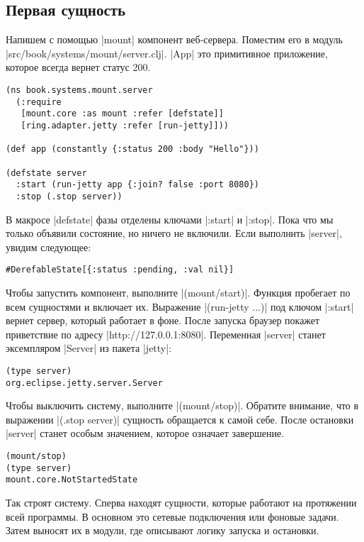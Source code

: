 \subsection{Первая сущность}

Напишем с помощью \spverb|mount| компонент веб-сервера. Поместим его в модуль
\spverb|src/book/systems/mount/server.clj|. \spverb|App| это примитивное
приложение, которое всегда вернет статус 200.

\begin{verbatim}
(ns book.systems.mount.server
  (:require
   [mount.core :as mount :refer [defstate]]
   [ring.adapter.jetty :refer [run-jetty]]))

(def app (constantly {:status 200 :body "Hello"}))

(defstate server
  :start (run-jetty app {:join? false :port 8080})
  :stop (.stop server))
\end{verbatim}

В макросе \spverb|defstate| фазы отделены ключами \spverb|:start| и
\spverb|:stop|. Пока что мы только объявили состояние, но ничего не
включили. Если выполнить \spverb|server|, увидим следующее:

\begin{verbatim}
#DerefableState[{:status :pending, :val nil}]
\end{verbatim}

Чтобы запустить компонент, выполните \spverb|(mount/start)|. Функция пробегает
по всем сущностями и включает их. Выражение \spverb|(run-jetty ...)| под ключом
\spverb|:start| вернет сервер, который работает в фоне. После запуска браузер
покажет приветствие по адресу \spverb|http://127.0.0.1:8080|. Переменная
\spverb|server| станет эксемпляром \spverb|Server| из пакета \spverb|jetty|:

\begin{verbatim}
(type server)
org.eclipse.jetty.server.Server
\end{verbatim}

Чтобы выключить систему, выполните \spverb|(mount/stop)|. Обратите внимание, что
в выражении \spverb|(.stop server)| сущность обращается к самой себе. После
остановки \spverb|server| станет особым значением, которое означает завершение.

\begin{verbatim}
(mount/stop)
(type server)
mount.core.NotStartedState
\end{verbatim}

Так строят систему. Сперва находят сущности, которые работают на протяжении всей
программы. В основном это сетевые подключения или фоновые задачи. Затем выносят
их в модули, где описывают логику запуска и остановки.

